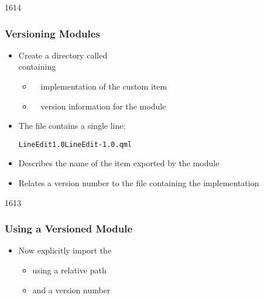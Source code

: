 
\begin{slide}{1614}\frametitle{Versioning Modules}


\begin{itemize}
\item Create a directory called \\
      containing
  \begin{itemize}
  \item {}~\textendash~implementation of the custom item
  \item {}~\textendash~version information for the module
  \end{itemize}

\item The  file contains a single line:

\begin{alltt}
LineEdit 1.0 LineEdit-1.0.qml
\end{alltt}

\item Describes the name of the item exported by the module
\item Relates a version number to the file containing the implementation
\end{itemize}

\end{slide}


\begin{slide}{1613}\frametitle{Using a Versioned Module}


\vspace*{0.5em}
\begin{itemize}
\item Now explicitly import the 
  \begin{itemize}
  \item using a relative path
  \item and a version number
  \end{itemize}
\end{itemize}



\end{slide}

